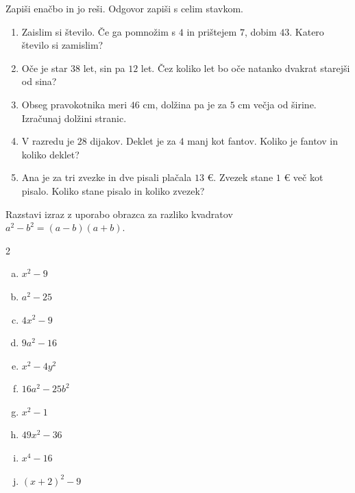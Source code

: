 \documentclass[a4paper,12pt]{letter}
\begin{document}
\begin{naloga}
Zapi\v{s}i ena\v{c}bo in jo re\v{s}i. Odgovor zapi\v{s}i s celim stavkom.

\begin{enumerate}[1.)]
\item Zaislim si \v{s}tevilo. \v{C}e ga pomno\v{z}im s $4$ in pri\v{s}tejem $7$, dobim $43$.
      Katero \v{s}tevilo si zamislim?
\item O\v{c}e je star $38$ let, sin pa $12$ let. \v{C}ez koliko let bo o\v{c}e natanko
      dvakrat starej\v{s}i od sina?
\item Obseg pravokotnika meri $46$ cm, dol\v{z}ina pa je za $5$ cm ve\v{c}ja od \v{s}irine.
      Izra\v{c}unaj dol\v{z}ini stranic.
\item V razredu je $28$ dijakov. Deklet je za $4$ manj kot fantov.
      Koliko je fantov in koliko deklet?
\item Ana je za tri zvezke in dve pisali pla\v{c}ala $13$ \euro{}. Zvezek stane
      $1$ \euro{} ve\v{c} kot pisalo. Koliko stane pisalo in koliko zvezek?
\end{enumerate}
\end{naloga}

\newpage

\begin{naloga}
Razstavi izraz z uporabo obrazca za razliko kvadratov $a^2-b^2=(a-b)(a+b)$.

\begin{multicols}{2}
\begin{enumerate}[a.)]
\item $x^2-9$
\item $a^2-25$
\item $4x^2-9$
\item $9a^2-16$
\item $x^2-4y^2$
\item $16a^2-25b^2$
\item $x^2-1$
\item $49x^2-36$
\item $x^4-16$
\item $(x+2)^2-9$
\end{enumerate}
\end{multicols}
\end{naloga}
\end{document}
